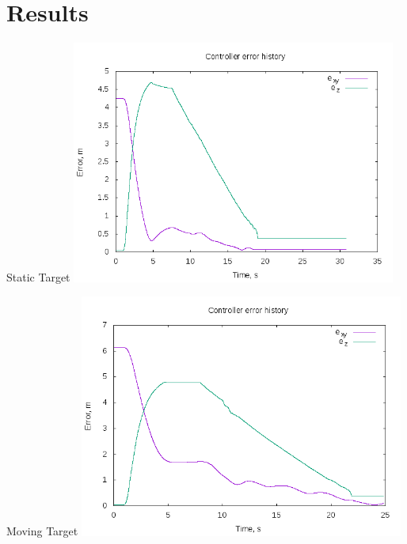 \documentclass[]{beamer}
\begin{document}
\section{Results}
\begin{frame}[fragile]{Static Target}
    \centering
    \vspace{1em}\hspace{3em}
    \includegraphics[width=0.8\textwidth]{../tikz/static_smach_good_plot}
\end{frame}


\begin{frame}{Moving Target}
    \centering
    \vspace{1em}\hspace{3em}
    \includegraphics[width=0.8\textwidth]{../tikz/moving_line_good_plot}
\end{frame}

\end{document}

